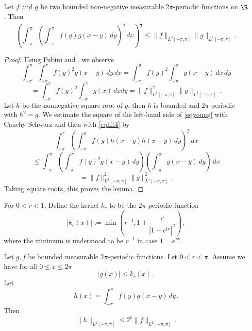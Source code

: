 \begin{lemma}\label{Young-convolution}
    Let $f$ and $g$ be two bounded non-negative measurable $2\pi$-periodic functions on $\R$. Then
    \begin{equation}\label{eqyoung}
        \left(\int_{-\pi}^{\pi} \left(\int_{-\pi}^{\pi}
        f(y)g(x-y)\, dy\right)^2\, dx\right)^{\frac 12}\le \|f\|_{L^2[-\pi, \pi]} \|g\|_{L^1[-\pi, \pi]}\, .
    \end{equation}
    \end{lemma}
\begin{proof}
Using Fubini and , we observe
\begin{equation*}
  \int_{-\pi}^{\pi}\int_{-\pi}^{\pi}f(y)^2g(x-y)\, dy
    \, dx=\int_{-\pi}^{\pi}f(y)^2\int_{-\pi}^{\pi}g(x-y)\, dx
    \, dy
\end{equation*}
\begin{equation}\label{eqhil4}
=\int_{-\pi}^{\pi}f(y)^2\int_{-\pi}^{\pi}g(x) \, dx
     dy
=\|f\|_{L^2[-\pi, \pi]}^2\|g\|_{L^1[-\pi, \pi]}\, .
\end{equation}
   Let $h$ be the nonnegative square root of $g$, then
   $h$ is bounded and $2\pi$-periodic with $h^2=g$.
   We estimate the square of the left-hand side of
   \eqref{eqyoung} with Cauchy-Schwarz and then with
   \eqref{eqhil4} by
       \begin{equation*}
         \int_{-\pi}^{\pi} (\int_{-\pi}^{\pi}f(y)h(x-y)h(x-y)\, dy)^2\, dx
   \end{equation*}
\begin{equation*}
    \le \int_{-\pi}^{\pi}\left(\int_{-\pi}^{\pi}f(y)^2g(x-y)\, dy\right)
    \left(\int_{-\pi}^{\pi}g(x-y)\, dy\right)\, dx
\end{equation*}
\begin{equation*}
    = \|f\|_{L^2[-\pi, \pi]}^2\|g\|_{L^1[-\pi, \pi]}^2\, .
\end{equation*}
Taking square roots, this proves the lemma.
\end{proof}

For $0<r<1$, Define the kernel $k_r$ to be the $2\pi$-periodic function
\begin{equation}
    |k_r(x)|:=\min \left(r^{-1}, 1+\frac r{|1-e^{ix}|^2}\right)\, ,
\end{equation}
where the minimum is understood to be $r^{-1}$ in case $1=e^{ix}$.
\begin{lemma}
\label{integrable-bump-convolution}
Let $g,f$ be bounded measurable $2\pi$-periodic functions. Let $0<r<\pi$.
Assume we have for all $0\le x\le 2\pi$
\begin{equation}\label{ebump1}
    |g(x)|\le k_r(x)\, .
\end{equation}
Let
\begin{equation}
   h(x)= \int_{-\pi}^{\pi} f(y)g(x-y)\, dy \, .
\end{equation}
Then
\begin{equation}
   \|h\|_{L^2[-\pi, \pi]}\le 2^{5}\|f\|_{L^2[-\pi, \pi]} \, .
\end{equation}

\end{lemma}


